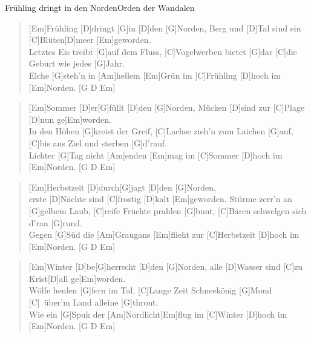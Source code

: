 \begin{song}{Fr\"uhling dringt in den Norden}{Orden der Wandalen}

    \begin{verse}  
        [Em]Fr\"uhling [D]dringt [G]in [D]den [G]Norden,
        Berg und [D]Tal sind ein [C]Bl\"uten[D]meer [Em]geworden. \\
        Letztes Eis treibt [G]auf dem Fluss,
        [C]Vogelwerben bietet [G]dar
        [C]die Geburt wie jedes [G]Jahr. \\
        [C]Elche [G]steh'n
        in [Am]hellem [Em]Gr\"un
        im [C]Fr\"uhling [D]hoch im [Em]Norden. [G D Em]
    \end{verse}  

    \begin{verse}  
        [Em]Sommer [D]er[G]f\"ullt [D]den [G]Norden,
        M\"ucken [D]sind zur [C]Plage [D]nun ge[Em]worden. \\
        In den H\"ohen [G]kreist der Greif,
        [C]Lachse zieh'n zum Laichen [G]auf,
        [C]bis ans Ziel und sterben [G]d'rauf. \\
        [C]Lichter [G]Tag
        nicht [Am]enden [Em]mag
        im [C]Sommer [D]hoch im [Em]Norden. [G D Em]
    \end{verse}  

    \begin{verse}  
        [Em]Herbstzeit [D]durch[G]jagt [D]den [G]Norden, \\
        erste [D]N\"achte sind [C]frostig [D]kalt [Em]geworden.
        St\"urme zerr'n an [G]gelbem Laub,
        [C]reife Früchte prahlen [G]bunt,
        [C]B\"aren schwelgen sich d'ran [G]rund. \\
        [C]Gegen [G]S\"ud
        die [Am]Graugans [Em]flieht
        zur [C]Herbstzeit [D]hoch im [Em]Norden. [G D Em]
    \end{verse}  

    \begin{verse}  
        [Em]Winter [D]be[G]herrscht [D]den [G]Norden,
        alle [D]Wasser sind [C]zu Krist[D]all ge[Em]worden. \\
        W\"olfe heulen [G]fern im Tal,
        [C]Lange Zeit Schneek\"onig [G]Mond
        [C]\ \"uber'm Land alleine [G]thront. \\
        [C]Wie ein [G]Spuk
        der [Am]Nordlicht[Em]flug
        im [C]Winter [D]hoch im [Em]Norden. [G D Em]
    \end{verse}  


\end{song}
